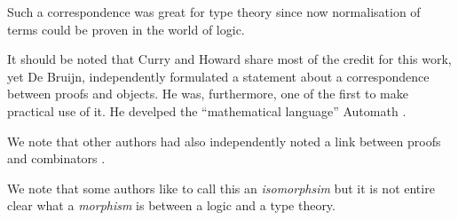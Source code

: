 Such a correspondence was great for type theory since now normalisation of terms could be proven in the world of logic.

It should be noted that Curry and Howard share most of the credit for this work, yet De Bruijn, independently formulated a statement about a correspondence between proofs and objects. He was, furthermore, one of the first to make practical use of it. He develped the ``mathematical language'' Automath \cite{DEBRUIJN1994141}. 

\begin{remark}
    We note that other authors had also independently noted a link between proofs and combinators \cite{meredith1963}. 
\end{remark} 

\begin{remark}
    We note that some authors like to call this an \emph{isomorphsim} but it is not entire clear what a \emph{morphism} is between a logic and a type theory.
\end{remark}











